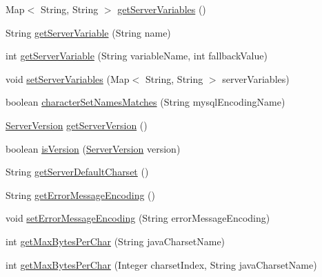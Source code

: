 \begin{DoxyCompactItemize}
\item 
Map$<$ String, String $>$ \mbox{\hyperlink{classcom_1_1mysql_1_1cj_1_1protocol_1_1x_1_1_x_server_session_a142b6d30c477a3acc641a55d3c7cc42b}{get\+Server\+Variables}} ()
\item 
String \mbox{\hyperlink{classcom_1_1mysql_1_1cj_1_1protocol_1_1x_1_1_x_server_session_a3e6841daa14568f979bc90c9a48e1daf}{get\+Server\+Variable}} (String name)
\item 
int \mbox{\hyperlink{classcom_1_1mysql_1_1cj_1_1protocol_1_1x_1_1_x_server_session_a71b98c34fcfe39e2a7ef2d9143f3e309}{get\+Server\+Variable}} (String variable\+Name, int fallback\+Value)
\item 
void \mbox{\hyperlink{classcom_1_1mysql_1_1cj_1_1protocol_1_1x_1_1_x_server_session_affb18fb89e4799f066674d120f2c9088}{set\+Server\+Variables}} (Map$<$ String, String $>$ server\+Variables)
\item 
boolean \mbox{\hyperlink{classcom_1_1mysql_1_1cj_1_1protocol_1_1x_1_1_x_server_session_af9937bac8e0266eeea9e7cb23a0b37d0}{character\+Set\+Names\+Matches}} (String mysql\+Encoding\+Name)
\item 
\mbox{\hyperlink{classcom_1_1mysql_1_1cj_1_1_server_version}{Server\+Version}} \mbox{\hyperlink{classcom_1_1mysql_1_1cj_1_1protocol_1_1x_1_1_x_server_session_a55b0588085914fbaa110c3e593efec8f}{get\+Server\+Version}} ()
\item 
boolean \mbox{\hyperlink{classcom_1_1mysql_1_1cj_1_1protocol_1_1x_1_1_x_server_session_aa121370ff7a1579fd5d7f4d653594f49}{is\+Version}} (\mbox{\hyperlink{classcom_1_1mysql_1_1cj_1_1_server_version}{Server\+Version}} version)
\item 
String \mbox{\hyperlink{classcom_1_1mysql_1_1cj_1_1protocol_1_1x_1_1_x_server_session_a7258b06a9876fde6f4ca0726a8fff500}{get\+Server\+Default\+Charset}} ()
\item 
String \mbox{\hyperlink{classcom_1_1mysql_1_1cj_1_1protocol_1_1x_1_1_x_server_session_aaca8fbddd509b49577e2da35a3f52643}{get\+Error\+Message\+Encoding}} ()
\item 
void \mbox{\hyperlink{classcom_1_1mysql_1_1cj_1_1protocol_1_1x_1_1_x_server_session_a8dbd15cc8a7b909c36ca095b96a06fed}{set\+Error\+Message\+Encoding}} (String error\+Message\+Encoding)
\item 
int \mbox{\hyperlink{classcom_1_1mysql_1_1cj_1_1protocol_1_1x_1_1_x_server_session_a76d2f1168707f9d53d95e2d50a2a091b}{get\+Max\+Bytes\+Per\+Char}} (String java\+Charset\+Name)
\item 
int \mbox{\hyperlink{classcom_1_1mysql_1_1cj_1_1protocol_1_1x_1_1_x_server_session_ad81f8d89d2f108ebfd67061ce7e1259e}{get\+Max\+Bytes\+Per\+Char}} (Integer charset\+Index, String java\+Charset\+Name)

\end{DoxyCompactItemize}
